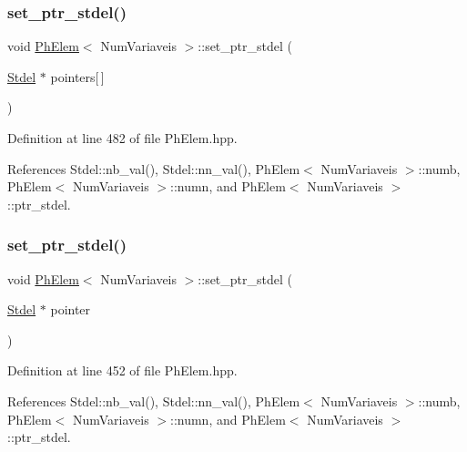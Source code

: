 \subsubsection{\texorpdfstring{set\+\_\+ptr\+\_\+stdel()}{set\_ptr\_stdel()}\hspace{0.1cm}{\footnotesize\ttfamily [2/3]}}
{\footnotesize\ttfamily void \hyperlink{classPhElem}{Ph\+Elem}$<$ Num\+Variaveis $>$\+::set\+\_\+ptr\+\_\+stdel (\begin{DoxyParamCaption}\item[{\hyperlink{classStdel}{Stdel} $\ast$}]{pointers\mbox{[}$\,$\mbox{]} }\end{DoxyParamCaption})\hspace{0.3cm}{\ttfamily [inherited]}}



Definition at line 482 of file Ph\+Elem.\+hpp.



References Stdel\+::nb\+\_\+val(), Stdel\+::nn\+\_\+val(), Ph\+Elem$<$ Num\+Variaveis $>$\+::numb, Ph\+Elem$<$ Num\+Variaveis $>$\+::numn, and Ph\+Elem$<$ Num\+Variaveis $>$\+::ptr\+\_\+stdel.

\mbox{\label{classPhElem_a78130ee8d7d6ecf59f231dbd436e9081}} 
\subsubsection{\texorpdfstring{set\+\_\+ptr\+\_\+stdel()}{set\_ptr\_stdel()}\hspace{0.1cm}{\footnotesize\ttfamily [3/3]}}
{\footnotesize\ttfamily void \hyperlink{classPhElem}{Ph\+Elem}$<$ Num\+Variaveis $>$\+::set\+\_\+ptr\+\_\+stdel (\begin{DoxyParamCaption}\item[{\hyperlink{classStdel}{Stdel} $\ast$}]{pointer }\end{DoxyParamCaption})\hspace{0.3cm}{\ttfamily [inherited]}}



Definition at line 452 of file Ph\+Elem.\+hpp.



References Stdel\+::nb\+\_\+val(), Stdel\+::nn\+\_\+val(), Ph\+Elem$<$ Num\+Variaveis $>$\+::numb, Ph\+Elem$<$ Num\+Variaveis $>$\+::numn, and Ph\+Elem$<$ Num\+Variaveis $>$\+::ptr\+\_\+stdel.

